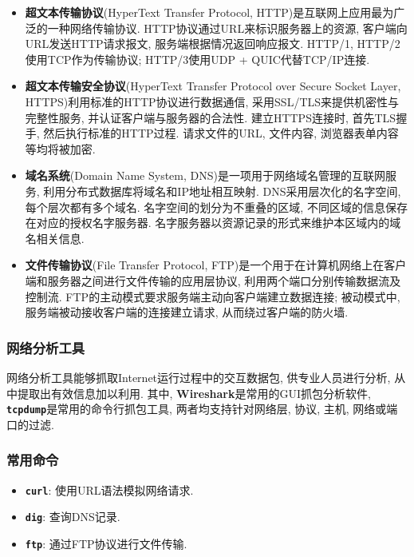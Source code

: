 \documentclass{ned-article}
\begin{document}
\begin{itemize}
    \item \textbf{超文本传输协议}(HyperText Transfer Protocol, HTTP)是互联网上应用最为广泛的一种网络传输协议. HTTP协议通过URL来标识服务器上的资源, 客户端向URL发送HTTP请求报文, 服务端根据情况返回响应报文. HTTP/1, HTTP/2使用TCP作为传输协议; HTTP/3使用UDP + QUIC代替TCP/IP连接.
    \item \textbf{超文本传输安全协议}(HyperText Transfer Protocol over Secure Socket Layer, HTTPS)利用标准的HTTP协议进行数据通信, 采用SSL/TLS来提供机密性与完整性服务, 并认证客户端与服务器的合法性. 建立HTTPS连接时, 首先TLS握手, 然后执行标准的HTTP过程. 请求文件的URL, 文件内容, 浏览器表单内容等均将被加密.
    \item \textbf{域名系统}(Domain Name System, DNS)是一项用于网络域名管理的互联网服务, 利用分布式数据库将域名和IP地址相互映射. DNS采用层次化的名字空间, 每个层次都有多个域名. 名字空间的划分为不重叠的区域, 不同区域的信息保存在对应的授权名字服务器. 名字服务器以资源记录的形式来维护本区域内的域名相关信息.
    \item \textbf{文件传输协议}(File Transfer Protocol, FTP)是一个用于在计算机网络上在客户端和服务器之间进行文件传输的应用层协议, 利用两个端口分别传输数据流及控制流. FTP的主动模式要求服务端主动向客户端建立数据连接; 被动模式中, 服务端被动接收客户端的连接建立请求, 从而绕过客户端的防火墙.
\end{itemize}

\subsubsection{网络分析工具}

网络分析工具能够抓取Internet运行过程中的交互数据包, 供专业人员进行分析, 从中提取出有效信息加以利用. 其中, \textbf{Wireshark}是常用的GUI抓包分析软件, \textbf{\texttt{tcpdump}}是常用的命令行抓包工具, 两者均支持针对网络层, 协议, 主机, 网络或端口的过滤.

\subsubsection{常用命令}

\begin{itemize}[noitemsep]
    \item \textbf{\texttt{curl}}: 使用URL语法模拟网络请求.
    \item \textbf{\texttt{dig}}:  查询DNS记录.
    \item \textbf{\texttt{ftp}}:  通过FTP协议进行文件传输.
\end{itemize}
\end{document}

